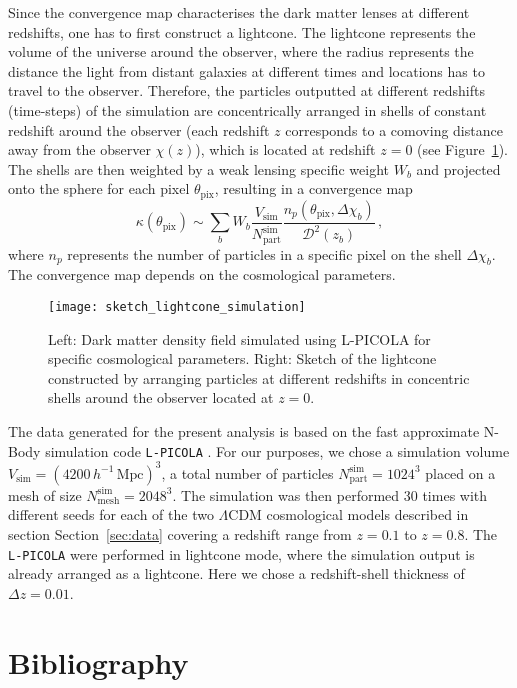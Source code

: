 \documentclass[final,twocolumn,3p,times,sort&compress]{elsarticle}
\newcommand{\figref}[1]{Figure~\ref{fig:#1}}
\newcommand{\secref}[1]{Section~\ref{sec:#1}}
\newcommand{\1}{\b{1}}              %
\newcommand{\0}{\b{0}}              %
\newcommand{\pkg}[1]{\texttt{#1}}
\begin{document}
Since the convergence map characterises the dark matter lenses at different redshifts, one has to first construct a lightcone. The lightcone represents the volume of the universe around the observer, where the radius represents the distance the light from distant galaxies at different times and locations has to travel to the observer. Therefore, the particles outputted at different redshifts (time-steps) of the simulation are concentrically arranged in shells of constant redshift around the observer (each redshift $z$ corresponds to a comoving distance away from the observer $\chi(z)$), which is located at redshift $z=0$ (see \figref{sketch_lightcone_simulation}). The shells are then weighted by a weak lensing specific weight $W_b$ and projected onto the sphere for each pixel $\theta_\mathrm{pix}$, resulting in a convergence map
\begin{equation}
\kappa (\theta_\mathrm{pix}) \sim \sum_b W_b \frac{V_\mathrm{sim}}{N_\mathrm{part}^\mathrm{sim}} \frac{n_p (\theta_\mathrm{pix}, \Delta \chi_b)}{\mathcal{D}^2 (z_b)}  \, ,
\end{equation}
where $n_p$ represents the number of particles in a specific pixel on the shell $\Delta \chi_b$. The convergence map depends on the cosmological parameters.

\begin{figure}[ht!]
	\centering
	\texttt{[image: sketch\_lightcone\_simulation]}
	\caption{Left: Dark matter density field simulated using L-PICOLA for specific cosmological parameters. Right: Sketch of the lightcone constructed by arranging particles at different redshifts in concentric shells around the observer located at $z=0$.}
	\label{fig:sketch_lightcone_simulation}
\end{figure}

The data generated for the present analysis is based on the fast approximate N-Body simulation code \pkg{L-PICOLA} \citep{howlett2015lpicola}. For our purposes, we chose a simulation volume $V_\mathrm{sim} = (4200 \, h^{-1}\, \mathrm{Mpc})^3$, a total number of particles $N_\mathrm{part}^\mathrm{sim} = 1024^3$ placed on a mesh of size $N_\mathrm{mesh}^\mathrm{sim} = 2048^3$. The simulation was then performed 30 times with different seeds for each of the two $\Lambda$CDM cosmological models described in section \secref{data} covering a redshift range from $z = 0.1$ to $z = 0.8$. The \pkg{L-PICOLA} were performed in lightcone mode, where the simulation output is already arranged as a lightcone. Here we chose a redshift-shell thickness of $\Delta z = 0.01$.

\section*{Bibliography}


\end{document}
